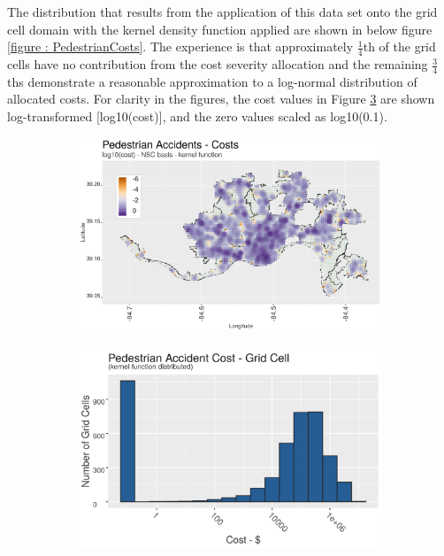 \documentclass{llncs}
\begin{document}
The distribution that results from the application of this data set onto the grid cell domain with the kernel density function applied are shown in below figure \ref{figure : PedestrianCosts}. The experience is that approximately $\frac{1}{4}$th of the grid cells have no contribution from the cost severity allocation and the remaining $\frac{3}{4}$ths demonstrate a reasonable approximation to a log-normal distribution of allocated costs. For clarity in the figures, the cost values in Figure  \ref{figure : pedestrianAccidentCostsHistogram} are shown log-transformed [log10(cost)], and the zero values scaled as log10(0.1).



\FloatBarrier
\begin{figure}
 	\caption{Pedestrian Accidents - Comprehensive Cost Severity (\$ Millions)}
    \label{figure : PedestrianCosts}
  \begin{subfigure}[b]{0.5\textwidth}
    \includegraphics[width = \textwidth, height = \textheight, keepaspectratio]{trafficAccidentsPedestrianCosts.png}
    \label{figure : trafficAccidentsPedestrianCosts}
  \end{subfigure}
  \begin{subfigure}[b]{0.5\textwidth}
    \includegraphics[width = \textwidth, height = \textheight, keepaspectratio]{pedestrianAccidentCostsHistogram.png}
    \label{figure : pedestrianAccidentCostsHistogram}
  \end{subfigure}
\end{figure}
\FloatBarrier
\end{document}
